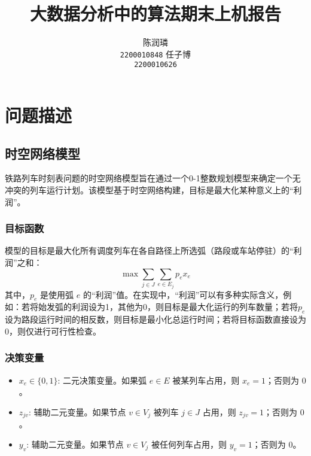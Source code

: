 \documentclass{article}
\title{大数据分析中的算法期末上机报告}
\author{%
    \large 陈润璘 \\
    \large \texttt{2200010848}
    \And
    \large 任子博 \\
    \large \texttt{2200010626}
}
\begin{document}
\maketitle

\section{问题描述}

\subsection{时空网络模型}\label{subsec:spatial-temporal-network-model}

铁路列车时刻表问题的时空网络模型旨在通过一个0-1整数规划模型来确定一个无冲突的列车运行计划。该模型基于时空网络构建，目标是最大化某种意义上的“利润”。

\subsubsection{目标函数}
模型的目标是最大化所有调度列车在各自路径上所选弧（路段或车站停驻）的“利润”之和：
\begin{equation}
    \max \sum_{j \in J} \sum_{e \in E_j} p_e x_e\label{eq:obj}
\end{equation}
其中，$p_e$ 是使用弧 $e$
的“利润”值。在实现中，“利润”可以有多种实际含义，例如：若将始发弧的利润设为1，其他为0，则目标是最大化运行的列车数量；若将$p_e$设为路段运行时间的相反数，则目标是最小化总运行时间；若将目标函数直接设为0，则仅进行可行性检查。

\subsubsection{决策变量}
\begin{itemize}
    \item $x_e \in \{0,1\}$: 二元决策变量。如果弧 $e \in E$ 被某列车占用，则 $x_e = 1$；否则为 $0$。
    \item $z_{jv}$: 辅助二元变量。如果节点 $v \in V_j$ 被列车 $j \in J$ 占用，则
        $z_{jv} = 1$；否则为 $0$。
    \item $y_v$: 辅助二元变量。如果节点 $v \in V_j$ 被任何列车占用，则 $y_v = 1$；否则为 $0$。
\end{itemize}
\end{document}
